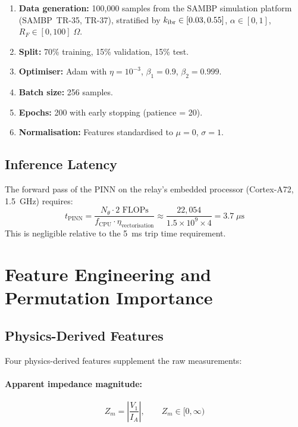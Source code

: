 \begin{enumerate}
\item \textbf{Data generation:} 100{,}000 samples from the SAMBP
      simulation platform (SAMBP~TR-35, TR-37), stratified by
      $k_\mathrm{ibr} \in [0.03, 0.55]$, $\alpha \in [0, 1]$, $R_F \in [0, 100]\;\Omega$.
\item \textbf{Split:} 70\% training, 15\% validation, 15\% test.
\item \textbf{Optimiser:} Adam with $\eta = 10^{-3}$, $\beta_1 = 0.9$,
      $\beta_2 = 0.999$.
\item \textbf{Batch size:} 256 samples.
\item \textbf{Epochs:} 200 with early stopping (patience = 20).
\item \textbf{Normalisation:} Features standardised to $\mu = 0$, $\sigma = 1$.
\end{enumerate}

\subsection{Inference Latency}

The forward pass of the PINN on the relay's embedded processor
(Cortex-A72, 1.5~GHz) requires:
\begin{equation}
  t_\mathrm{PINN} = \frac{N_\theta \cdot 2 \text{ FLOPs}}
    {f_\mathrm{CPU} \cdot \eta_\mathrm{vectorisation}}
  \approx \frac{22{,}054}{1.5 \times 10^9 \times 4} = 3.7\;\mu\mathrm{s}
  \label{eq:ch8_latency}
\end{equation}
This is negligible relative to the 5~ms trip time requirement.

\section{Feature Engineering and Permutation Importance}
\label{sec:ch8_features}

\subsection{Physics-Derived Features}

Four physics-derived features supplement the raw measurements:

\paragraph{Apparent impedance magnitude:}
\begin{equation}
  Z_m = \left|\frac{V_1}{I_A}\right|, \qquad Z_m \in [0, \infty)
  \label{eq:ch8_zm}
\end{equation}

